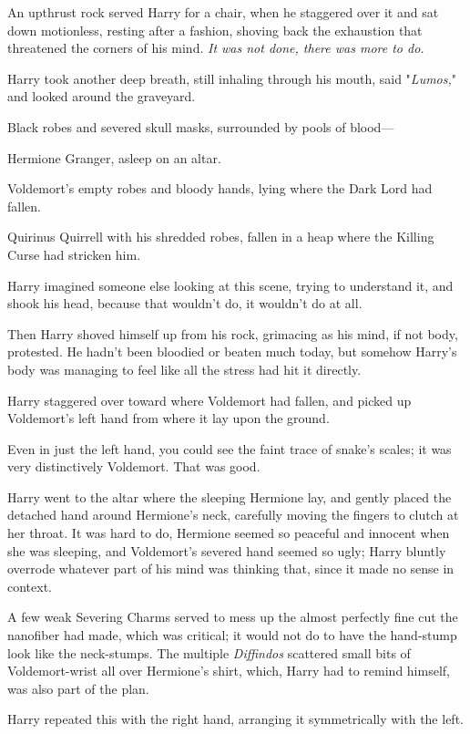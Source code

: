 An upthrust rock served Harry for a chair, when he staggered over it and sat
down motionless, resting after a fashion, shoving back the exhaustion that
threatened the corners of his mind. \emph{It was not done, there was more to
do.}

Harry took another deep breath, still inhaling through his mouth, said
"\emph{Lumos,}" and looked around the graveyard.

Black robes and severed skull masks, surrounded by pools of blood—

Hermione Granger, asleep on an altar.

Voldemort's empty robes and bloody hands, lying where the Dark Lord had fallen.

Quirinus Quirrell with his shredded robes, fallen in a heap where the Killing
Curse had stricken him.

Harry imagined someone else looking at this scene, trying to understand it, and
shook his head, because that wouldn't do, it wouldn't do at all.

Then Harry shoved himself up from his rock, grimacing as his mind, if not body,
protested. He hadn't been bloodied or beaten much today, but somehow Harry's
body was managing to feel like all the stress had hit it directly.

Harry staggered over toward where Voldemort had fallen, and picked up
Voldemort's left hand from where it lay upon the ground.

Even in just the left hand, you could see the faint trace of snake's scales; it
was very distinctively Voldemort. That was good.

Harry went to the altar where the sleeping Hermione lay, and gently placed the
detached hand around Hermione's neck, carefully moving the fingers to clutch at
her throat. It was hard to do, Hermione seemed so peaceful and innocent when
she was sleeping, and Voldemort's severed hand seemed so ugly; Harry bluntly
overrode whatever part of his mind was thinking that, since it made no sense in
context.

A few weak Severing Charms served to mess up the almost perfectly fine cut the
nanofiber had made, which was critical; it would not do to have the hand-stump
look like the neck-stumps. The multiple \emph{Diffindos} scattered small bits
of Voldemort-wrist all over Hermione's shirt, which, Harry had to remind
himself, was also part of the plan.

Harry repeated this with the right hand, arranging it symmetrically with the
left.

